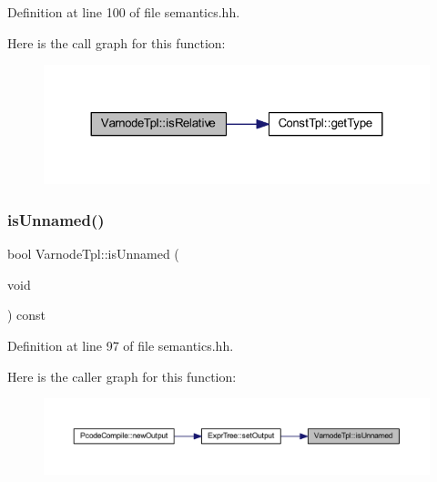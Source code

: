 Definition at line 100 of file semantics.\+hh.

Here is the call graph for this function\+:
\nopagebreak
\begin{figure}[H]
\begin{center}
\leavevmode
\includegraphics[width=324pt]{class_varnode_tpl_acc2762c411899ba3a7801566aebdcbef_cgraph}
\end{center}
\end{figure}
\mbox{\label{class_varnode_tpl_a0c5a2963be70cc43f2b75d75413b000d}} 
\subsubsection{\texorpdfstring{isUnnamed()}{isUnnamed()}}
{\footnotesize\ttfamily bool Varnode\+Tpl\+::is\+Unnamed (\begin{DoxyParamCaption}\item[{void}]{ }\end{DoxyParamCaption}) const\hspace{0.3cm}{\ttfamily [inline]}}



Definition at line 97 of file semantics.\+hh.

Here is the caller graph for this function\+:
\nopagebreak
\begin{figure}[H]
\begin{center}
\leavevmode
\includegraphics[width=350pt]{class_varnode_tpl_a0c5a2963be70cc43f2b75d75413b000d_icgraph}
\end{center}
\end{figure}
\mbox{\label{class_varnode_tpl_afb237a19b4a1a81572066ecec94bfa14}} 
